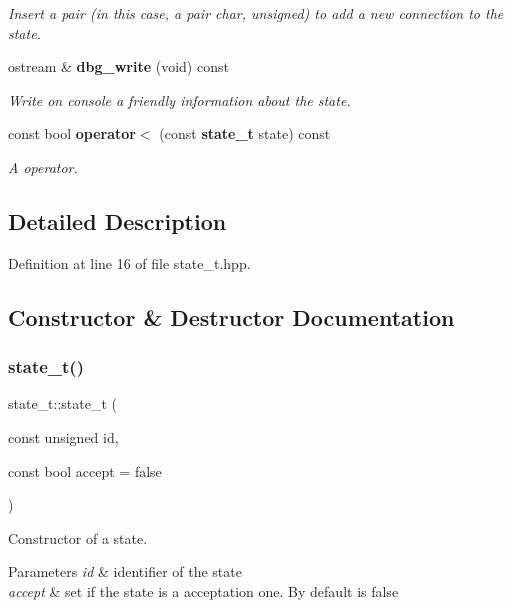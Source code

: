 \begin{DoxyCompactItemize}
\begin{DoxyCompactList}\small\item\em Insert a pair (in this case, a pair char, unsigned) to add a new connection to the state. \end{DoxyCompactList}\item 
ostream \& \textbf{ dbg\+\_\+write} (void) const
\begin{DoxyCompactList}\small\item\em Write on console a friendly information about the state. \end{DoxyCompactList}\item 
const bool \textbf{ operator$<$} (const \textbf{ state\+\_\+t} state) const
\begin{DoxyCompactList}\small\item\em A operator. \end{DoxyCompactList}\end{DoxyCompactItemize}


\subsection{Detailed Description}


Definition at line 16 of file state\+\_\+t.\+hpp.



\subsection{Constructor \& Destructor Documentation}
\mbox{\label{classstate__t_ad94bc43e1e3df9f60b4844b75fa0ee3e}} 
\subsubsection{state\+\_\+t()}
{\footnotesize\ttfamily state\+\_\+t\+::state\+\_\+t (\begin{DoxyParamCaption}\item[{const unsigned}]{id,  }\item[{const bool}]{accept = {\ttfamily false} }\end{DoxyParamCaption})}



Constructor of a state. 


\begin{DoxyParams}{Parameters}
{\em id} & identifier of the state \\
\hline
{\em accept} & set if the state is a acceptation one. By default is false \\
\hline
\end{DoxyParams}


